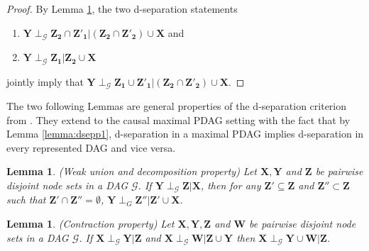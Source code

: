 \documentclass[11pt,a4paper]{article}
\newtheorem{Lemma}[Satz]{Lemma}
\theoremstyle{definition}
\theoremstyle{remark}
\newcommand{\mpdag}{maximal PDAG}
\newcommand{\g}[1][G]{\mathcal{#1}}
\begin{document}
\begin{proof}
	  By Lemma \ref{lemma: contraction}, the two d-separation statements 
	  \begin{enumerate}
	  	\item $\mathbf{Y} \perp_{\g} \mathbf{Z_2} \cap \mathbf{Z'_1}| (\mathbf{Z_2} \cap \mathbf{Z'_2}) \cup \mathbf{X}$ and
	  	\item $\mathbf{Y} \perp_{\g} \mathbf{Z_1} | \mathbf{Z_2} \cup \mathbf{X}$
	  \end{enumerate}  jointly imply that 
	  $\mathbf{Y} \perp_{\g} \mathbf{Z_1} \cup \mathbf{Z'_1} | (\mathbf{Z_2} \cap \mathbf{Z'_2}) \cup \mathbf{X}$.
	 
	 
	 
	 
\end{proof}

The two following Lemmas are general properties of the d-separation criterion from \citet{verma1990causal}. They extend to the causal \mpdag{} setting with the fact that by Lemma \ref{lemma:dsepp1}, d-separation in a \mpdag{} implies d-separation in every represented DAG and vice versa. 



\begin{Lemma} (Weak union and decomposition property)
	\label{lemma: weak union}
	Let $\mathbf{X},\mathbf{Y}$ and $\mathbf{Z}$ be pairwise disjoint node sets in a DAG $\g$. If $\mathbf{Y} \perp_{\g} \mathbf{Z} | \mathbf{X}$, then for any $\mathbf{Z'} \subseteq \mathbf{Z}$ and $\mathbf{Z''} \subset \mathbf{Z}$ such that $\mathbf{Z'} \cap \mathbf{Z''} = \emptyset$, $\mathbf{Y} \perp_{G} \mathbf{Z''}|\mathbf{Z'} \cup \mathbf{X}$. 
\end{Lemma}


\begin{Lemma} (Contraction property)
	\label{lemma: contraction}
	Let $\mathbf{X},\mathbf{Y},\mathbf{Z}$ and $\mathbf{W}$ be pairwise disjoint node sets in a DAG $\g$. If $\mathbf{X} \perp_{\g} \mathbf{Y} | \mathbf{Z}$ and $\mathbf{X} \perp_{\g} \mathbf{W} | \mathbf{Z} \cup \mathbf{Y}$ then $\mathbf{X} \perp_{\g} \mathbf{Y} \cup \mathbf{W} | \mathbf{Z}$.
\end{Lemma}


\end{document}
